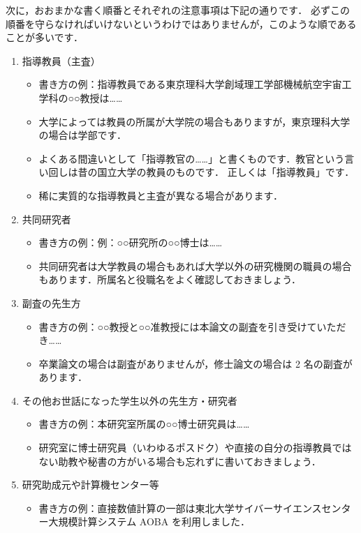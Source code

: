 次に，おおまかな書く順番とそれぞれの注意事項は下記の通りです．
必ずこの順番を守らなければいけないというわけではありませんが，このような順であることが多いです．
\begin{enumerate}
    \item 指導教員（主査）
    \begin{itemize}
        \item 書き方の例：指導教員である東京理科大学創域理工学部機械航空宇宙工学科の○○教授は……
        \item 大学によっては教員の所属が大学院の場合もありますが，東京理科大学の場合は学部です．
        \item よくある間違いとして「指導教官の……」と書くものです．教官という言い回しは昔の国立大学の教員のものです．
        正しくは「指導教員」です．
        \item 稀に実質的な指導教員と主査が異なる場合があります．
    \end{itemize}
    \item 共同研究者
    \begin{itemize}
        \item 書き方の例：例：○○研究所の○○博士は……
        \item 共同研究者は大学教員の場合もあれば大学以外の研究機関の職員の場合もあります．所属名と役職名をよく確認しておきましょう．
    \end{itemize}
    \item 副査の先生方
    \begin{itemize}
        \item 書き方の例：○○教授と○○准教授には本論文の副査を引き受けていただき……
        \item 卒業論文の場合は副査がありませんが，修士論文の場合は 2 名の副査があります．
    \end{itemize}
    \item その他お世話になった学生以外の先生方・研究者
    \begin{itemize}
        \item 書き方の例：本研究室所属の○○博士研究員は……
        \item 研究室に博士研究員（いわゆるポスドク）や直接の自分の指導教員ではない助教や秘書の方がいる場合も忘れずに書いておきましょう．
    \end{itemize}
    \item 研究助成元や計算機センター等
    \begin{itemize}
        \item 書き方の例：直接数値計算の一部は東北大学サイバーサイエンスセンター大規模計算システム AOBA を利用しました．

\end{itemize}
\end{enumerate}
